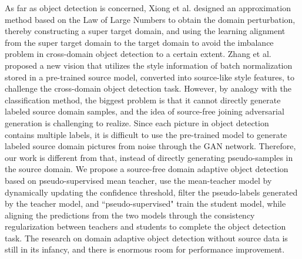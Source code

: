 \documentclass[sn-mathphys]{sn-jnl}%
\theoremstyle{thmstyleone}%
\theoremstyle{thmstyletwo}%
\theoremstyle{thmstylethree}%
\begin{document}
As far as object detection is concerned, Xiong et al.\cite{xiong2021source} designed an approximation method based on the Law of Large Numbers to obtain the domain perturbation, thereby constructing a super target domain, and using the learning alignment from the super target domain to the target domain to avoid the imbalance problem in cross-domain object detection to a certain extent. Zhang et al.\cite{zhang2021source} proposed a new vision that utilizes the style information of batch normalization stored in a pre-trained source model, converted into source-like style features, to challenge the cross-domain object detection task. However, by analogy with the classification method, the biggest problem is that it cannot directly generate labeled source domain samples, and the idea of source-free joining adversarial generation\cite{ganin2015unsupervised} is challenging to realize. Since each picture in object detection contains multiple labels, it is difficult to use the pre-trained model to generate labeled source domain pictures from noise through the GAN network. Therefore, our work is different from that, instead of directly generating pseudo-samples in the source domain. We propose a source-free domain adaptive object detection based on pseudo-supervised mean teacher, use the mean-teacher model by dynamically updating the confidence threshold, filter the pseudo-labels generated by the teacher model, and ``pseudo-supervised" train the student model, while aligning the predictions from the two models through the consistency regularization between teachers and students\cite{xu2020exploring} to complete the object detection task. The research on domain adaptive object detection without source data is still in its infancy, and there is enormous room for performance improvement.
\end{document}
